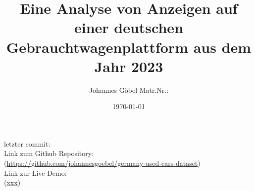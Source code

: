 \subject{Projektbericht zum Modul Information Retrieval und Visualisierung Sommersemester 2022}
\title{Eine Analyse von Anzeigen auf einer deutschen
Gebrauchtwagenplattform aus dem Jahr 2023}
\author{Johannes Göbel Matr.Nr.: }%
\date{\today}
\maketitle%
\vspace{10cm}
\begin{centering}

\hline
\vspace{0.5cm}
letzter commit: \\
Link zum Github Repository: \\
(\href{https://github.com/johannesgoebel/germany-used-cars-dataset}{https://github.com/johannesgoebel/germany-used-cars-dataset}) \\

Link zur Live Demo: \\
(\href{xxxx}{xxx})
    
\end{centering}
\clearpage